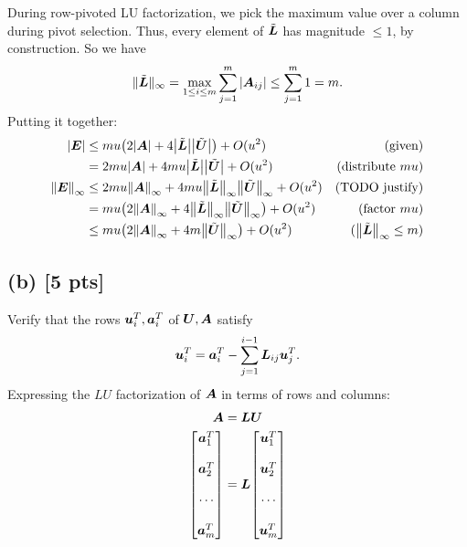 \documentclass[twoside,10pt]{article}
\begin{document}
\quad During row-pivoted LU factorization, we pick the maximum value over a column during pivot selection.
Thus, every element of $\tilde{\bm{L}}$ has magnitude $\leq 1$, by construction.
So we have
$$\|\tilde{\mtx{L}}\|_{\infty} = \max\limits_{1\leq i\leq m}{\sum\limits_{j=1}^{m}{\left|\mtx{A}_{ij}\right|}} \leq \sum\limits_{j=1}^{m}{1} = m.$$
\quad Putting it together:
\begin{align*}
  \left|\mtx{E}\right| &\leq m u \left(2 \left|\mtx{A}\right| + 4 \left|\tilde{\mtx{L}} \right| \left|\tilde{\mtx{U}}\right|\right) + O(u^2)&\text{(given)}\\
  &= 2 m u \left|\mtx{A}\right| + 4 m u \left|\tilde{\mtx{L}} \right| \left|\tilde{\mtx{U}}\right| + O(u^2)&\text{(distribute $mu$)}\\
  \left\|\mtx{E}\right\|_{\infty} &\leq 2 m u \left\|\mtx{A}\right\|_{\infty} + 4 m u \left\|\tilde{\mtx{L}}\right\|_{\infty} \left\|\tilde{\mtx{U}}\right\|_{\infty} + O(u^2)&\text{(TODO justify)}\\
  &= m u \left(2 \left\|\mtx{A}\right\|_{\infty} + 4 \left\|\tilde{\mtx{L}}\right\|_{\infty} \left\|\tilde{\mtx{U}}\right\|_{\infty} \right) + O(u^2)&\text{(factor $mu$)}\\
  &\leq m u \left(2 \left\|\mtx{A}\right\|_{\infty} + 4 m \left\|\tilde{\mtx{U}}\right\|_{\infty} \right) + O(u^2)&\text{($\left\|\tilde{\mtx{L}}\right\|_{\infty} \leq m$)}\\
\end{align*}
  
\subsection*{(b) [5 pts]}
Verify that the rows $\bm{u}_{i}^{T}, \bm{a}_{i}^{T}$ of $\bm{U}, \bm{A}$ satisfy 
\begin{equation}
  \bm{u}_{i}^{T} = \bm{a}_i^T - \sum \limits_{j = 1}^{i - 1} \bm{L}_{ij} \bm{u}_{j}^T.
\end{equation}
\quad Expressing the $LU$ factorization of $\bm{A}$ in terms of rows and columns:
\begin{align*}
  \mtx{A} &= \mtx{L}\mtx{U}\\
  \begin{bmatrix*}
    \vct{a}_1^T\\\\
    \vct{a}_2^T\\\\
    \cdots\\\\
    \vct{a}_m^T
  \end{bmatrix*}
  &=
  \mtx{L} 
  \begin{bmatrix*}
    \vct{u}_{1}^{T}\\\\
    \vct{u}_{2}^{T}\\\\
    \cdots\\\\\vct{u}_{m}^{T}
  \end{bmatrix*}
\end{align*}
\end{document}
